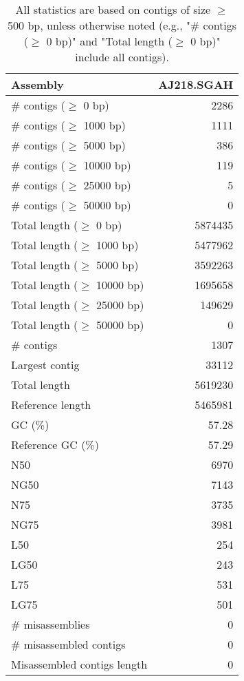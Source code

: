 \documentclass[12pt,a4paper]{article}
\begin{document}
\begin{table}[ht]
\begin{center}
\caption{All statistics are based on contigs of size $\geq$ 500 bp, unless otherwise noted (e.g., "\# contigs ($\geq$ 0 bp)" and "Total length ($\geq$ 0 bp)" include all contigs).}
\begin{tabular}{|l*{1}{|r}|}
\hline
Assembly & AJ218.SGAH \\ \hline
\# contigs ($\geq$ 0 bp) & 2286 \\ \hline
\# contigs ($\geq$ 1000 bp) & 1111 \\ \hline
\# contigs ($\geq$ 5000 bp) & 386 \\ \hline
\# contigs ($\geq$ 10000 bp) & 119 \\ \hline
\# contigs ($\geq$ 25000 bp) & 5 \\ \hline
\# contigs ($\geq$ 50000 bp) & 0 \\ \hline
Total length ($\geq$ 0 bp) & 5874435 \\ \hline
Total length ($\geq$ 1000 bp) & 5477962 \\ \hline
Total length ($\geq$ 5000 bp) & 3592263 \\ \hline
Total length ($\geq$ 10000 bp) & 1695658 \\ \hline
Total length ($\geq$ 25000 bp) & 149629 \\ \hline
Total length ($\geq$ 50000 bp) & 0 \\ \hline
\# contigs & 1307 \\ \hline
Largest contig & 33112 \\ \hline
Total length & 5619230 \\ \hline
Reference length & 5465981 \\ \hline
GC (\%) & 57.28 \\ \hline
Reference GC (\%) & 57.29 \\ \hline
N50 & 6970 \\ \hline
NG50 & 7143 \\ \hline
N75 & 3735 \\ \hline
NG75 & 3981 \\ \hline
L50 & 254 \\ \hline
LG50 & 243 \\ \hline
L75 & 531 \\ \hline
LG75 & 501 \\ \hline
\# misassemblies & 0 \\ \hline
\# misassembled contigs & 0 \\ \hline
Misassembled contigs length & 0 \\ \hline

\end{tabular}
\end{center}
\end{table}
\end{document}
